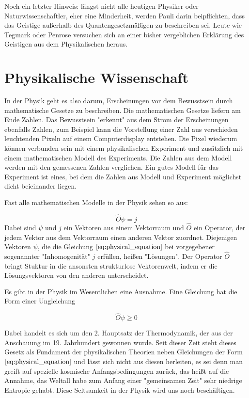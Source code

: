 \documentclass[12pt]{book}
\begin{document}
Noch ein letzter Hinweis: längst nicht alle heutigen Physiker oder Naturwissenschaftler, eher eine Minderheit, werden Pauli darin beipflichten, dass das Geistige außerhalb des Quantengesetzmäßigen zu beschreiben sei. Leute wie Tegmark oder Penrose versuchen sich an einer bisher vergeblichen Erklärung des Geistigen aus dem Physikalischen heraus.

\section{Physikalische Wissenschaft}

In der Physik geht es also darum, Erscheinungen vor dem Bewusstsein durch mathematische Gesetze zu beschreiben. Die mathematischen Gesetze liefern am Ende Zahlen. Das Bewusstsein "erkennt" aus dem Strom der Erscheinungen ebenfalls Zahlen, zum Beispiel kann die Vorstellung einer Zahl aus verschieden leuchtenden Pixeln auf einem Computerdisplay entstehen. Die Pixel wiederum können verbunden sein mit einem physikalischen Experiment und zusätzlich mit einem mathematischen Modell des Experiments. Die Zahlen aus dem Modell werden mit den gemessenen Zahlen verglichen. Ein gutes Modell für das Experiment ist eines, bei dem die Zahlen aus Modell und Experiment möglichst dicht beieinander liegen. 

Fast alle mathematischen Modelle in der Physik sehen so aus:

\begin{equation} 
\hat{O}\psi = j
\label{eq:physical_equation}
\end{equation}
Dabei sind $\psi$ und $j$ ein Vektoren aus einem Vektorraum und $\hat{O}$ ein Operator, der jedem Vektor aus dem Vektorraum einen anderen Vektor zuordnet. Diejenigen Vektoren $\psi$, die die Gleichung $\eqref{eq:physical_equation}$ bei vorgegebener sogenannter "Inhomogenität" $j$ erfüllen, heißen "Lösungen". Der Operator $\hat{O}$ bringt Stuktur in die ansonsten strukturlose Vektorenwelt, indem er die Lösungsvektoren von den anderen unterscheidet.

Es gibt in der Physik im Wesentlichen eine Ausnahme. Eine Gleichung hat die Form einer Ungleichung

\begin{equation} 
\hat{O}\psi \geq 0
\label{eq:physical_inequality}
\end{equation}

Dabei handelt es sich um den 2. Hauptsatz der Thermodynamik, der aus der Anschauung im 19. Jahrhundert gewonnen wurde. Seit dieser Zeit steht dieses Gesetz als Fundament der physikalischen Theorien neben Gleichungen der Form $\eqref{eq:physical_equation}$ und lässt sich nicht aus diesen herleiten, es sei denn man greift auf spezielle kosmische Anfangsbedingungen zurück, das heißt auf die Annahme, das Weltall habe zum Anfang einer "gemeinsamen Zeit" sehr niedrige Entropie gehabt. Diese Seltsamkeit in der Physik wird uns noch beschäftigen.
\end{document}

